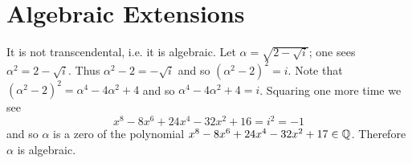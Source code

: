 \section{Algebraic Extensions}
\begin{questions}
    \item It is not transcendental, i.e. it is algebraic. Let $\alpha = \sqrt{2-\sqrt{i}}$; one sees $\alpha^2 = 2 - \sqrt{i}$. Thus $\alpha^2 - 2 = -\sqrt{i}$ and so $(\alpha^2-2)^2 = i$. Note that $(\alpha^2 - 2)^2 = \alpha^4 - 4\alpha^2 + 4$ and so $\alpha^4 - 4\alpha^2 + 4 = i$. Squaring one more time we see
    \[
        x^8 - 8x^6 + 24x^4 - 32x^2 + 16 = i^2 = -1
    \]
    and so $\alpha$ is a zero of the polynomial $x^8 - 8x^6 + 24x^4 - 32x^2 + 17 \in \mathbb{Q}$. Therefore $\alpha$ is algebraic.
\end{questions}

